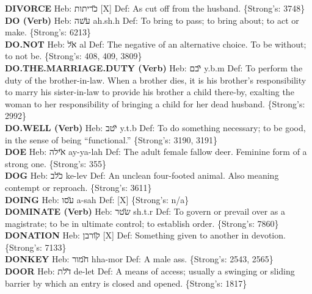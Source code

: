 {\textbf{DIVORCE} Heb: {\large\H כריתות} {[}X{]} Def: As cut off from the husband. \{Strong's: 3748\}\hfill{}\\

\textbf{DO (Verb)} Heb: {\large\H עשה} ah.sh.h Def: To bring to pass; to bring about; to act or make. \{Strong's: 6213\}\hfill{}\\

\textbf{DO.NOT} Heb: {\large\H אל} al Def: The negative of an alternative choice. To be without; to not be. \{Strong's: 408, 409, 3809\}\hfill{}\\

\textbf{DO.THE.MARRIAGE.DUTY (Verb)} Heb: {\large\H יבם} y.b.m Def: To perform the duty of the brother-in-law. When a brother dies, it is his brother's responsibility to marry his sister-in-law to provide his brother a child there-by, exalting the woman to her responsibility of bringing a child for her dead husband. \{Strong's: 2992\}\hfill{}\\

\textbf{DO.WELL (Verb)} Heb: {\large\H יטב} y.t.b Def: To do something necessary; to be good, in the sense of being ``functional.'' \{Strong's: 3190, 3191\}\hfill{}\\

\textbf{DOE} Heb: {\large\H אילה} ay-ya-lah Def: The adult female fallow deer. Feminine form of a strong one. \{Strong's: 355\}\hfill{}\\

\textbf{DOG} Heb: {\large\H כלב} ke-lev Def: An unclean four-footed animal. Also meaning contempt or reproach. \{Strong's: 3611\}\hfill{}\\

\textbf{DOING} Heb: {\large\H עסו} a-sah Def: {[}X{]} \{Strong's: n/a\}\hfill{}\\

\textbf{DOMINATE (Verb)} Heb: {\large\H שטר} sh.t.r Def: To govern or prevail over as a magistrate; to be in ultimate control; to establish order. \{Strong's: 7860\}\hfill{}\\

\textbf{DONATION} Heb: {\large\H קורבן} {[}X{]} Def: Something given to another in devotion. \{Strong's: 7133\}\hfill{}\\

\textbf{DONKEY} Heb: {\large\H חמור} hha-mor Def: A male ass. \{Strong's: 2543, 2565\}\hfill{}\\

\textbf{DOOR} Heb: {\large\H דלת} de-let Def: A means of access; usually a swinging or sliding barrier by which an entry is closed and opened. \{Strong's: 1817\}\hfill{}\\

}
